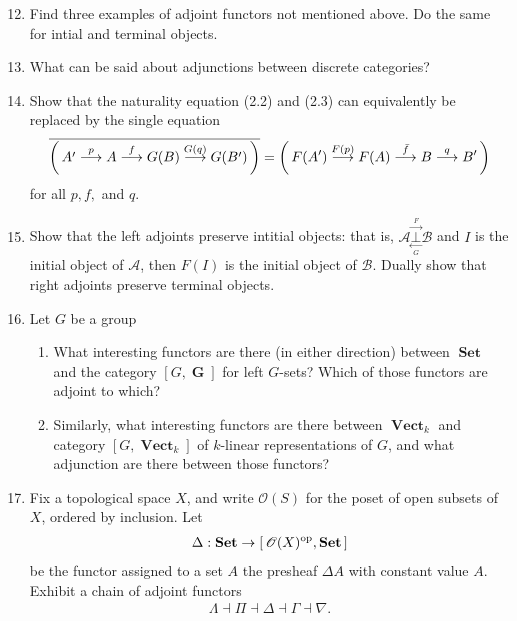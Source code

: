 \documentclass[12pt,a4paper]{report}
\newcommand{\ADJOINT}[2]{\underset{\underset{#2}\longleftarrow}{\overset{\overset{#1}\longrightarrow}\bot }}
\newcommand{\OP}{{\operatorname{op}}}
\newcommand{\CAT}[1]{\mathscr{#1}}
\newcommand{\CATSET}[1]{\operatorname{\textbf{#1}}}
\newcommand{\MORPHISM}[1]{\overset{#1}\longrightarrow}
\begin{document}
\begin{enumerate}[label=2.1.\arabic*]
\setcounter{enumi}{11}
\item  Find three examples of adjoint functors not mentioned above.  Do the same for intial and terminal objects.

\item What can be said about adjunctions between discrete categories?

\item Show that the naturality equation (2.2) and (2.3) can equivalently be replaced by the single equation 
\begin{align*}
	\CONJ{\PAREN{A'\MORPHISM{p}A\MORPHISM{f}G(B)\MORPHISM{G(q)}G(B')}} = \PAREN{F(A')\MORPHISM{F(p)}F(A)\MORPHISM{\bar{f}}B\MORPHISM{q}B'}
\end{align*}for all $p,f,$ and $q$.

\item Show that the left adjoints preserve intitial objects: that is, $\CAT{A}\ADJOINT{F}{G}\CAT{B}$ and $I$ is the initial object of $\CAT{A}$, then $F(I)$ is the initial object of $\CAT{B}$.  Dually show that right adjoints preserve terminal objects.

\item Let $G$ be a group
\begin{enumerate}[label=(\alph*)]

	\item What interesting functors are there (in either direction) between $\CATSET{Set}$ and the category $[G,\CATSET{G}]$ for left $G$-sets?  Which of those functors are adjoint to which?
	
	\item Similarly, what interesting functors are there between $\CATSET{Vect}_k$ and category $[G,\CATSET{Vect}_k]$ of $k$-linear representations of $G$, and what adjunction are there between those functors?

\end{enumerate}

\item Fix a topological space $X$, and write $\CAT{O}(S)$ for the poset of open subsets of $X$, ordered by inclusion.  Let \begin{align*}
	\Delta:\CATSET{Set}\to \SQBRACKET{\CAT{O}(X)^\OP,\CATSET{Set}}
\end{align*}be the functor assigned to a set $A$ the presheaf $\Delta A$ with constant value $A$.  Exhibit a chain of adjoint functors
\begin{align*}
	\Lambda \dashv \Pi \dashv \Delta \dashv \Gamma \dashv \nabla.
\end{align*}

\end{enumerate}
\end{document}
